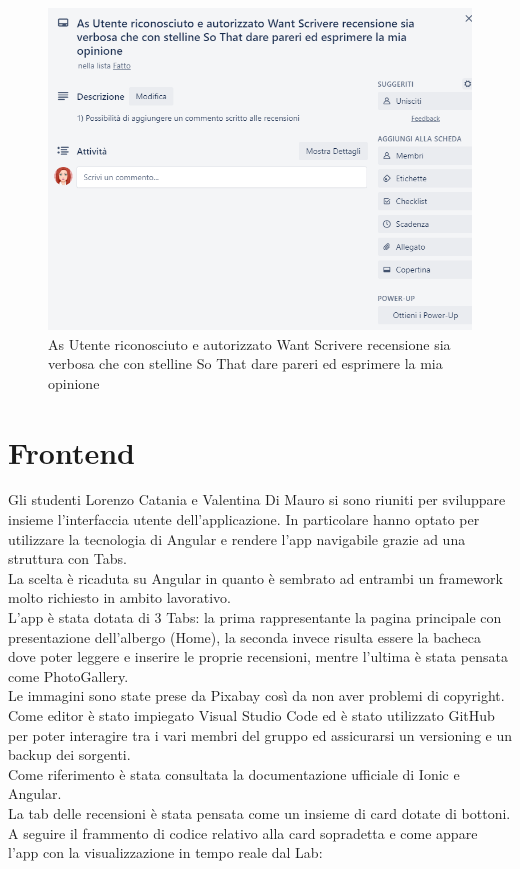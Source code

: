 \documentclass{article}[12pt]
\begin{document}
{{\begin{figure}
		\includegraphics[width=\columnwidth]{img/storia4.png}
		\caption{As Utente riconosciuto e autorizzato Want Scrivere recensione sia verbosa che con stelline So That dare pareri ed esprimere la mia opinione}
	\end{figure}
}\break

\section{Frontend}

Gli studenti Lorenzo Catania e Valentina Di Mauro si sono riuniti per sviluppare insieme l'interfaccia utente dell'applicazione. In particolare hanno optato per utilizzare la tecnologia di Angular e rendere l'app navigabile grazie ad una struttura con Tabs.\\ La scelta è ricaduta su Angular in quanto è sembrato ad entrambi un framework molto richiesto in ambito lavorativo. \\
L'app è stata dotata di 3 Tabs: la prima rappresentante la pagina principale con presentazione dell'albergo (Home), la seconda invece risulta essere la bacheca dove poter leggere e inserire le proprie recensioni, mentre l'ultima è stata pensata come PhotoGallery.\\ Le immagini sono state prese da Pixabay così da non aver problemi di copyright. 
Come editor è stato impiegato Visual Studio Code ed è stato utilizzato GitHub per poter interagire tra i vari membri del gruppo ed assicurarsi un versioning e un backup dei sorgenti.\\ 
Come riferimento è stata consultata la documentazione ufficiale di Ionic e Angular.\\ La tab delle recensioni è stata pensata come un insieme di card dotate di bottoni. 
A seguire il frammento di codice relativo alla card sopradetta e come appare l'app con la visualizzazione in tempo reale dal Lab:\\

}
\end{document}
